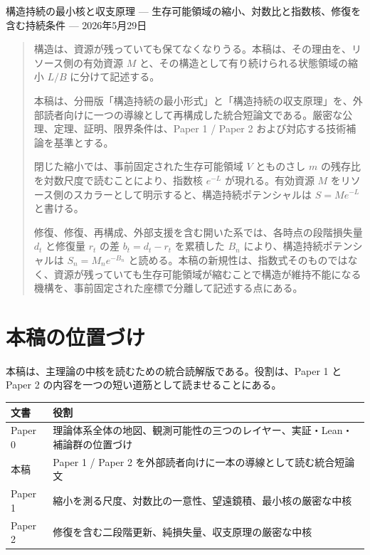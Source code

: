 \documentclass[12pt,a4paper]{article}
\begin{document}
\PaperTitleBlock
  {構造持続の最小核と収支原理}
  {— 生存可能領域の縮小、対数比と指数核、修復を含む持続条件 —}
  {2026年5月29日}

\begin{abstract}
構造は、資源が残っていても保てなくなりうる。本稿は、その理由を、リソース側の有効資源 \(M\) と、その構造として有り続けられる状態領域の縮小 \(L/B\) に分けて記述する。

本稿は、分冊版「構造持続の最小形式」と「構造持続の収支原理」を、外部読者向けに一つの導線として再構成した統合短論文である。厳密な公理、定理、証明、限界条件は、Paper 1 / Paper 2 および対応する技術補論を基準とする。

閉じた縮小では、事前固定された生存可能領域 \(V\) とものさし \(m\) の残存比を対数尺度で読むことにより、指数核 \(e^{-L}\) が現れる。有効資源 \(M\) をリソース側のスカラーとして明示すると、構造持続ポテンシャルは \(S=Me^{-L}\) と書ける。

修復、修復、再構成、外部支援を含む開いた系では、各時点の段階損失量 \(d_{t}\) と修復量 \(r_{t}\) の差 \(b_{t}=d_{t}-r_{t}\) を累積した \(B_{n}\) により、構造持続ポテンシャルは \(S_{n}=M_{n} e^{-B_{n}}\) と読める。本稿の新規性は、指数式そのものではなく、資源が残っていても生存可能領域が縮むことで構造が維持不能になる機構を、事前固定された座標で分離して記述する点にある。
\end{abstract}

\section{本稿の位置づけ}\label{ux672cux7a3fux306eux4f4dux7f6eux3065ux3051}

本稿は、主理論の中核を読むための統合読解版である。役割は、Paper 1 と Paper 2 の内容を一つの短い道筋として読ませることにある。

{\def\LTcaptype{table} %
\begin{longtable}[]{@{}
  >{\raggedright\arraybackslash}p{}
  >{\raggedright\arraybackslash}p{}@{}}
\toprule\noalign{}
\begin{minipage}[b]{\linewidth}\raggedright
文書
\end{minipage} & \begin{minipage}[b]{\linewidth}\raggedright
役割
\end{minipage} \\
\midrule\noalign{}
\endhead
\bottomrule\noalign{}
\endlastfoot
Paper 0 & 理論体系全体の地図、観測可能性の三つのレイヤー、実証・Lean・補論群の位置づけ \\
本稿 & Paper 1 / Paper 2 を外部読者向けに一本の導線として読む統合短論文 \\
Paper 1 & 縮小を測る尺度、対数比の一意性、望遠鏡積、最小核の厳密な中核 \\
Paper 2 & 修復を含む二段階更新、純損失量、収支原理の厳密な中核 \\
\end{longtable}
}
\end{document}
